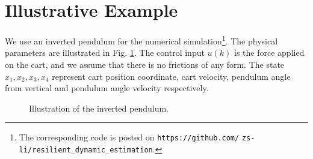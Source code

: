 \documentclass{ieeetrans}   %
\begin{document}
\section{Illustrative Example}\label{sec:sim}
We use an inverted pendulum for the numerical simulation\footnote{The corresponding code is posted on \texttt{https://github.com/} \texttt{zs-li/resilient\_dynamic\_estimation}.}. The physical parameters are illustrated in Fig. \ref{fig:invpen}. 
The control input $u(k)$ is the force applied on the cart, and we assume that there is no frictions of any form.
The state $x_1,x_2,x_3,x_4$ represent cart position coordinate, cart velocity, pendulum angle from vertical and pendulum angle velocity respectively. 
\begin{figure}[htpb]
	\centering\vspace{-10pt}
	\vspace{-10pt}
	\caption{Illustration of the inverted pendulum.}\label{fig:invpen}
\end{figure}
\end{document}
